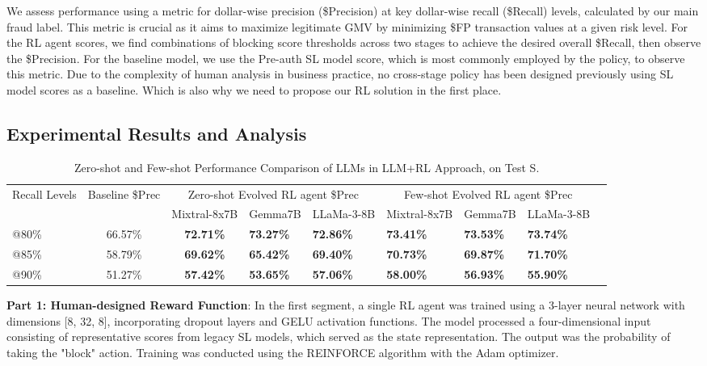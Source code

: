 \documentclass[11pt]{article}
\begin{document}
We assess performance using a metric for dollar-wise precision (\$Precision) at key dollar-wise recall (\$Recall) levels, calculated by our main fraud label. This metric is crucial as it aims to maximize legitimate GMV by minimizing \$FP transaction values at a given risk level. For the RL agent scores, we find combinations of blocking score thresholds across two stages to achieve the desired overall \$Recall, then observe the \$Precision. For the baseline model, we use the Pre-auth SL model score, which is most commonly employed by the policy, to observe this metric. Due to the complexity of human analysis in business practice, no cross-stage policy has been designed previously using SL model scores as a baseline. Which is also why we need to propose our RL solution in the first place. 

\subsection{Experimental Results and Analysis}

\begin{table}[t]
\centering
\small
\caption{Zero-shot and Few-shot Performance Comparison of LLMs in LLM+RL Approach, on Test S.}
\label{tab:performance_comparison}
\begin{tabular}{lccp{1.5cm}p{1.5cm}p{1.5cm}p{1.5cm}p{1.5cm}p{1.5cm}}
    \toprule
    \multirow{2}{*}{Recall Levels} & \multirow{2}{*}{Baseline \$Prec} & \multicolumn{3}{c}{Zero-shot Evolved RL agent \$Prec} & \multicolumn{3}{c}{Few-shot Evolved RL agent \$Prec} \\
    \cmidrule(lr){3-5} \cmidrule(lr){6-8}
    & & Mixtral-8x7B & Gemma7B & LLaMa-3-8B & Mixtral-8x7B & Gemma7B & LLaMa-3-8B \\
    \midrule
    @80\%  & 66.57\% & \textbf{72.71\%} & \textbf{73.27\%} & \textbf{72.86\%} & \textbf{73.41\%} & \textbf{73.53\%} & \textbf{73.74\%} \\ 
    @85\%  & 58.79\% & \textbf{69.62\%} & \textbf{65.42\%} & \textbf{69.40\%} & \textbf{70.73\%} & \textbf{69.87\%} & \textbf{71.70\%} \\ 
    @90\%  & 51.27\% & \textbf{57.42\%} & \textbf{53.65\%} & \textbf{57.06\%} & \textbf{58.00\%} & \textbf{56.93\%} & \textbf{55.90\%} \\ 
    \bottomrule
\end{tabular}
\end{table}

\textbf{Part 1: Human-designed Reward Function}:
In the first segment, a single RL agent was trained using a 3-layer neural network with dimensions [8, 32, 8], incorporating dropout layers and GELU activation functions. The model processed a four-dimensional input consisting of representative scores from legacy SL models, which served as the state representation. The output was the probability of taking the "block" action. Training was conducted using the REINFORCE algorithm with the Adam optimizer.
\end{document}
